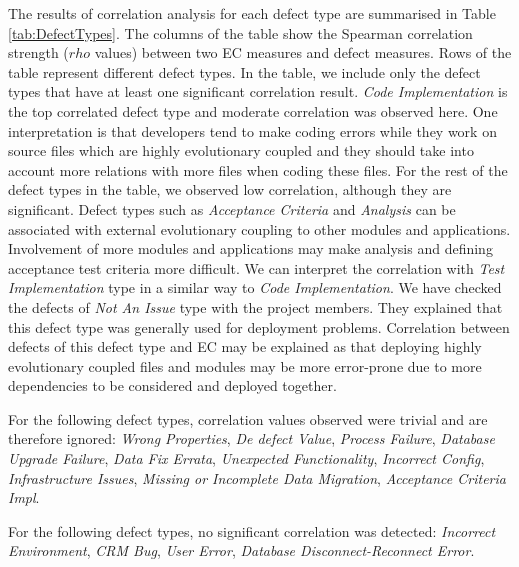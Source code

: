 \documentclass[times]{smrauth}
\begin{document}
The results of correlation analysis for each defect type are summarised in Table \ref{tab:DefectTypes}. The columns of the table show the Spearman correlation strength ($rho$ values) between two EC measures and defect measures. Rows of the table represent different defect types. In the table, we include only the defect types that have at least one significant correlation result. \textit{Code Implementation} is the top correlated defect type and moderate correlation was observed here. One interpretation is that developers tend to make coding errors while they work on source files which are highly evolutionary coupled and they should take into account more relations with more files when coding these files. For the rest of the defect types in the table, we observed low correlation, although they are significant. Defect types such as \textit{Acceptance Criteria} and \textit{Analysis} can be associated with external evolutionary coupling to other modules and applications. Involvement of more modules and applications may make analysis and defining acceptance test criteria more difficult. We can interpret the correlation with \textit{Test Implementation} type in a similar way to \textit{Code Implementation}. We have checked the defects of \textit{Not An Issue} type with the project members. They explained that this defect type was generally used for deployment problems. Correlation between defects of this defect type and EC may be explained as that deploying highly evolutionary coupled files and modules may be more error-prone due to more dependencies to be considered and deployed together.


For the following defect types, correlation values observed were trivial and are therefore ignored: \textit{Wrong Properties}, \textit{De defect  Value}, \textit{Process Failure}, \textit{Database Upgrade Failure}, \textit{Data Fix Errata}, \textit{Unexpected Functionality}, \textit{Incorrect Config}, \textit{Infrastructure Issues}, \textit{Missing or Incomplete Data Migration}, \textit{Acceptance Criteria Impl}.

For the following defect types, no significant correlation was detected: \textit{Incorrect Environment}, \textit{CRM Bug}, \textit{User Error}, \textit{Database Disconnect-Reconnect Error}.
\end{document}
